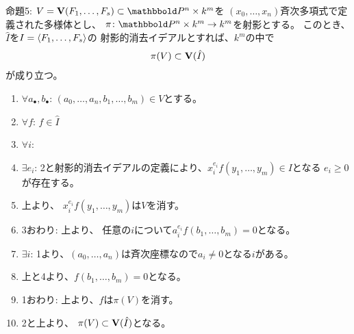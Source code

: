 \begin{framed}
  命題5:
  $V=\var(F_1,\dots,F_s) \subset \P^n \times k^m$を
  $(x_0,\dots,x_n)$斉次多項式で定義された多様体とし、
  $\pi\colon \P^n \times k^m \to k^m$を射影とする。
  このとき、$\hat I$を$I=\left\langle F_1,\dots,F_s \right\rangle$の
  射影的消去イデアルとすれば、$k^m$の中で
  \begin{align}
    \pi(V)\subset \textbf V(\hat I)
  \end{align}
  が成り立つ。
\end{framed}
\begin{myproof}
  \begin{enumerate}
    \item $\forall a_\bullet,b_\bullet$: $(a_0,\dots,a_n,b_1,\dots,b_m) \in V$とする。
    \item
    $\forall f$: $f\in \hat I$
    \item $\forall i$:
    \item $\exists e_i$:
    2と射影的消去イデアルの定義により、$ x_i^{e_i}f(y_1,\dots,y_m) \in I$となる
    $e_i \ge 0$が存在する。
    \item 上より、
    $x_i^{e_i}f(y_1,\dots,y_m)$は$V$を消す。
    \item
    3おわり: 上より、
    任意の$i$について$a_i^{e_i} f(b_1,\dots,b_m) = 0$となる。
    \item $\exists i$:
    1より、$(a_0,\dots,a_n)$は斉次座標なので$a_i \neq 0$となる$i$がある。
    \item
    上と4より、$f(b_1,\dots,b_m) = 0$となる。
    \item
    1おわり: 上より、$f$は$\pi(V)$を消す。
    \item 2と上より、
    $\pi(V) \subset \textbf V(\hat I)$となる。
  \end{enumerate}
\end{myproof}

